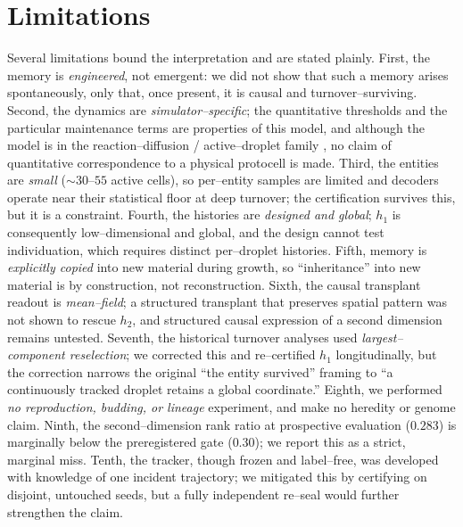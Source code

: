 \documentclass[11pt]{article}
\begin{document}
\section{Limitations}
Several limitations bound the interpretation and are stated plainly. First, the memory is \emph{engineered}, not
emergent: we did not show that such a memory arises spontaneously, only that, once present, it is causal and
turnover--surviving. Second, the dynamics are \emph{simulator--specific}; the quantitative thresholds and the
particular maintenance terms are properties of this model, and although the model is in the reaction--diffusion /
active--droplet family \citep{turing1952,zwicker2017}, no claim of quantitative correspondence to a physical protocell
is made. Third, the entities are \emph{small} ($\sim$$30$--$55$ active cells), so per--entity samples are limited and
decoders operate near their statistical floor at deep turnover; the certification survives this, but it is a
constraint. Fourth, the histories are \emph{designed and global}; $h_1$ is consequently low--dimensional and global,
and the design cannot test individuation, which requires distinct per--droplet histories. Fifth, memory is
\emph{explicitly copied} into new material during growth, so ``inheritance'' into new material is by construction,
not reconstruction. Sixth, the causal transplant readout is \emph{mean--field}; a structured transplant that
preserves spatial pattern was not shown to rescue $h_2$, and structured causal expression of a second dimension
remains untested. Seventh, the historical turnover analyses used \emph{largest--component reselection}; we corrected
this and re--certified $h_1$ longitudinally, but the correction narrows the original ``the entity survived'' framing
to ``a continuously tracked droplet retains a global coordinate.'' Eighth, we performed \emph{no reproduction,
budding, or lineage} experiment, and make no heredity or genome claim. Ninth, the second--dimension rank ratio at
prospective evaluation ($0.283$) is marginally below the preregistered gate ($0.30$); we report this as a strict,
marginal miss. Tenth, the tracker, though frozen and label--free, was developed with knowledge of one incident
trajectory; we mitigated this by certifying on disjoint, untouched seeds, but a fully independent re--seal would
further strengthen the claim.
\end{document}
